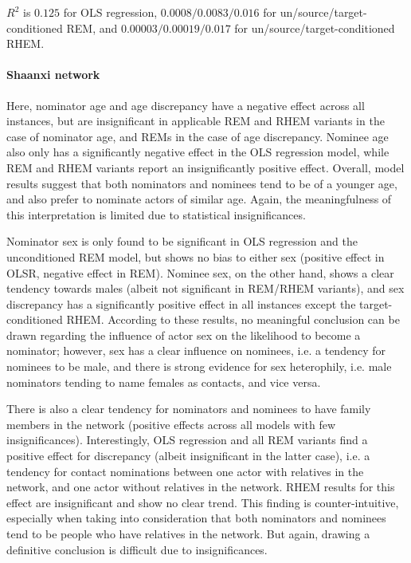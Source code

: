 $R^2$ is $0.125$ for OLS regression, $0.0008/0.0083/0.016$ for un/source/target-conditioned REM, and $0.00003/0.00019/0.017$ for un/source/target-conditioned RHEM. 

\paragraph{Shaanxi network} Here, nominator age and age discrepancy have a negative effect across all instances, but are insignificant in applicable REM and RHEM variants in the case of nominator age, and REMs in the case of age discrepancy. Nominee age also only has a significantly negative effect in the OLS regression model, while REM and RHEM variants report an insignificantly positive effect. Overall, model results suggest that both nominators and nominees tend to be of a younger age, and also prefer to nominate actors of similar age. Again, the meaningfulness of this interpretation is limited due to statistical insignificances.

Nominator sex is only found to be significant in OLS regression and the unconditioned REM model, but shows no bias to either sex (positive effect in OLSR, negative effect in REM). Nominee sex, on the other hand, shows a clear tendency towards males (albeit not significant in REM/RHEM variants), and sex discrepancy has a significantly positive effect in all instances except the target-conditioned RHEM. According to these results, no meaningful conclusion can be drawn regarding the influence of actor sex on the likelihood to become a nominator; however, sex has a clear influence on nominees, i.e. a tendency for nominees to be male, and there is strong evidence for sex heterophily, i.e. male nominators tending to name females as contacts, and vice versa. 

There is also a clear tendency for nominators and nominees to have family members in the network (positive effects across all models with few insignificances). Interestingly, OLS regression and all REM variants find a positive effect for discrepancy (albeit insignificant in the latter case), i.e. a tendency for contact nominations between one actor with relatives in the network, and one actor without relatives in the network. RHEM results for this effect are insignificant and show no clear trend. This finding is counter-intuitive, especially when taking into consideration that both nominators and nominees tend to be people who have relatives in the network. But again, drawing a definitive conclusion is difficult due to insignificances.

